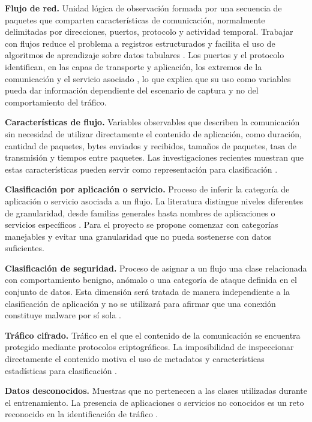 \documentclass[conference]{IEEEtran}
\begin{document}
\textbf{Flujo de red.} Unidad lógica de observación formada por una secuencia de paquetes que comparten características de comunicación, normalmente delimitadas por direcciones, puertos, protocolo y actividad temporal. Trabajar con flujos reduce el problema a registros estructurados y facilita el uso de algoritmos de aprendizaje sobre datos tabulares \cite{ahmed2021,roy2022}. Los puertos y el protocolo identifican, en las capas de transporte y aplicación, los extremos de la comunicación y el servicio asociado \cite{kurose2021}, lo que explica que su uso como variables pueda dar información dependiente del escenario de captura y no del comportamiento del tráfico.

\textbf{Características de flujo.} Variables observables que describen la comunicación sin necesidad de utilizar directamente el contenido de aplicación, como duración, cantidad de paquetes, bytes enviados y recibidos, tamaños de paquetes, tasa de transmisión y tiempos entre paquetes. Las investigaciones recientes muestran que estas características pueden servir como representación para clasificación \cite{shen2023,ahmed2021,roy2022,li2023}.

\textbf{Clasificación por aplicación o servicio.} Proceso de inferir la categoría de aplicación o servicio asociada a un flujo. La literatura distingue niveles diferentes de granularidad, desde familias generales hasta nombres de aplicaciones o servicios específicos \cite{aceto2021,zaki2022}. Para el proyecto se propone comenzar con categorías manejables y evitar una granularidad que no pueda sostenerse con datos suficientes.

\textbf{Clasificación de seguridad.} Proceso de asignar a un flujo una clase relacionada con comportamiento benigno, anómalo o una categoría de ataque definida en el conjunto de datos. Esta dimensión será tratada de manera independiente a la clasificación de aplicación y no se utilizará para afirmar que una conexión constituye malware por sí sola \cite{sharafaldin2018,moustafa2015}.

\textbf{Tráfico cifrado.} Tráfico en el que el contenido de la comunicación se encuentra protegido mediante protocolos criptográficos. La imposibilidad de inspeccionar directamente el contenido motiva el uso de metadatos y características estadísticas para clasificación \cite{shen2023,roy2022,li2023}.

\textbf{Datos desconocidos.} Muestras que no pertenecen a las clases utilizadas durante el entrenamiento. La presencia de aplicaciones o servicios no conocidos es un reto reconocido en la identificación de tráfico \cite{liang2024,pathmaperuma2022}.
\end{document}
